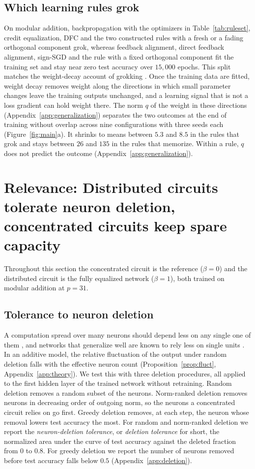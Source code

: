 \documentclass{article} %
\begin{document}
\subsection{Which learning rules grok}
\label{sec:grokrules}
On modular addition, backpropagation with the optimizers in Table~\ref{tab:ruleset}, credit equalization, DFC and the two constructed rules with a fresh or a fading orthogonal component grok, whereas feedback alignment, direct feedback alignment, sign-SGD and the rule with a fixed orthogonal component fit the training set and stay near zero test accuracy over $15{,}000$ epochs. This split matches the weight-decay account of grokking \citep{nanda2023progress,varma2023circuit}. Once the training data are fitted, weight decay removes weight along the directions in which small parameter changes leave the training outputs unchanged, and a learning signal that is not a loss gradient can hold weight there. The norm $q$ of the weight in these directions (Appendix~\ref{app:generalization}) separates the two outcomes at the end of training without overlap across nine configurations with three seeds each (Figure~\ref{fig:main}a). It shrinks to means between $5.3$ and $8.5$ in the rules that grok and stays between $26$ and $135$ in the rules that memorize. Within a rule, $q$ does not predict the outcome (Appendix~\ref{app:generalization}).

\section{Relevance: Distributed circuits tolerate neuron deletion, concentrated circuits keep spare capacity}
\label{sec:fragile}

Throughout this section the concentrated circuit is the reference ($\beta = 0$) and the distributed circuit is the fully equalized network ($\beta = 1$), both trained on modular addition at $p = 31$.


\subsection{Tolerance to neuron deletion}
A computation spread over many neurons should depend less on any single one of them \citep{georgopoulos1986population}, and networks that generalize well are known to rely less on single units \citep{morcos2018importance}. In an additive model, the relative fluctuation of the output under random deletion falls with the effective neuron count (Proposition~\ref{prop:fluct}, Appendix~\ref{app:theory}). We test this with three deletion procedures, all applied to the first hidden layer of the trained network without retraining. Random deletion removes a random subset of the neurons. Norm-ranked deletion removes neurons in decreasing order of outgoing norm, so the neurons a concentrated circuit relies on go first. Greedy deletion removes, at each step, the neuron whose removal lowers test accuracy the most. For random and norm-ranked deletion we report the \emph{neuron-deletion tolerance}, or \emph{deletion tolerance} for short, the normalized area under the curve of test accuracy against the deleted fraction from $0$ to $0.8$. For greedy deletion we report the number of neurons removed before test accuracy falls below $0.5$ (Appendix~\ref{app:deletion}).
\end{document}
